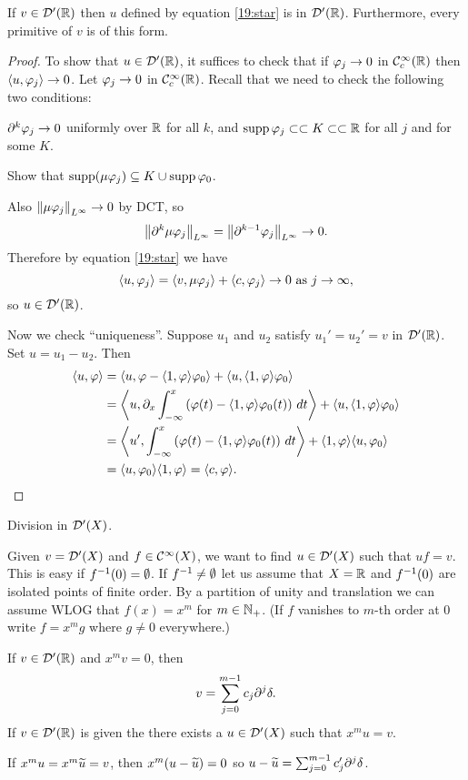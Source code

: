 \begin{thm}
  If $v\in\mathcal{D}'(\mathbb{R})$ then $u$ defined by equation \ref{19:star} is in $\mathcal{D}'(\mathbb{R})$.
  Furthermore, every primitive of $v$ is of this form.
\end{thm}

\begin{proof}
  To show that $u\in\mathcal{D}'(\mathbb{R})$, it suffices to check that if $\varphi_j\to0$ in $\mathcal{C}_c^\infty(\mathbb{R})$ then ${\left\langle u,\varphi_j \right\rangle}\to0$.
  Let $\varphi_j\to0$ in $\mathcal{C}_c^\infty(\mathbb{R})$.
  Recall that we need to check the following two conditions:
  \begin{itm}
    \io $\partial^k\varphi_j\to0$ uniformly over $\mathbb{R}$ for all $k$, and
    \io $\operatorname{supp}\varphi_j\subset\subset K\subset\subset \mathbb{R}$ for all $j$ and for some $K$.
  \end{itm}
  \begin{exer}
    Show that $\operatorname{supp}(\mu\varphi_j)\subseteq K\cup\operatorname{supp}\varphi_0$.
  \end{exer}
  Also $\left\lVert \mu\varphi_j \right\rVert_{L^\infty}\to0$ by DCT, so
  \[ \left\lVert \partial^k\mu\varphi_j \right\rVert_{L^\infty} = \left\lVert \partial^{k-1}\varphi_j \right\rVert_{L^\infty} \to 0. \]
  Therefore by equation \ref{19:star} we have
  \[ {\left\langle u,\varphi_j \right\rangle} = {\left\langle v,\mu\varphi_j \right\rangle} + {\left\langle c,\varphi_j \right\rangle} \to 0 \text{ as } j\to\infty, \]
  so $u\in\mathcal{D}'(\mathbb{R})$.

  Now we check ``uniqueness''.
  Suppose $u_1$ and $u_2$ satisfy $u_1'=u_2'=v$ in $\mathcal{D}'(\mathbb{R})$.
  Set $u=u_1-u_2$.
  Then
  \begin{align*}
    {\left\langle u,\varphi\right\rangle} &= {\left\langle u,\varphi-{\left\langle 1,\varphi \right\rangle}\varphi_0 \right\rangle} + {\left\langle u,{\left\langle 1,\varphi \right\rangle}\varphi_0 \right\rangle} \\
    &= {\left\langle u, \partial_x \int_{-\infty}^x \left( \varphi(t)-{\left\langle 1,\varphi \right\rangle}\varphi_0(t) \right) \, dt \right\rangle} + {\left\langle u,{\left\langle 1,\varphi \right\rangle}\varphi_0 \right\rangle} \\
    &= {\left\langle u', \int_{-\infty}^x \left( \varphi(t)-{\left\langle 1,\varphi \right\rangle}\varphi_0(t) \right) \, dt \right\rangle} + {\left\langle 1,\varphi \right\rangle}{\left\langle u,\varphi_0 \right\rangle} \\
    &= {\left\langle u,\varphi_0 \right\rangle}{\left\langle 1,\varphi \right\rangle} = {\left\langle c,\varphi \right\rangle}. \qedhere
  \end{align*}
\end{proof}

Division in $\mathcal{D}'(X)$.

Given $v=\mathcal{D}'(X)$ and $f\in\mathcal{C}^\infty(X)$, we want to find $u\in\mathcal{D}'(X)$ such that $uf=v$.
This is easy if $f^{-1}(0)=\emptyset$.
If $f^{-1}\neq\emptyset$ let us assume that $X=\mathbb{R}$ and $f^{-1}(0)$ are isolated points of finite order.
By a partition of unity and translation we can assume WLOG that $f(x)=x^m$ for $m\in\mathbb{N}_+$.
(If $f$ vanishes to $m$-th order at $0$ write $f=x^mg$ where $g\neq0$ everywhere.)

\begin{thm}
  \lv
  \begin{enum}
    \io If $v\in\mathcal{D}'(\mathbb{R})$ and $x^mv=0$, then
    \[ v = \sum_{j=0}^{m-1} c_j\partial^j\delta. \]
    \io If $v\in\mathcal{D}'(\mathbb{R})$ is given the there exists a $u\in\mathcal{D}'(X)$ such that $x^mu=v$.
  \end{enum}
\end{thm}

\begin{rmk}
  If $x^mu=x^m\widetilde u=v$, then $x^m(u-\widetilde u)=0$ so $u-\widetilde u=\sum_{j=0}^{m-1}c'_j\partial^j\delta$.
\end{rmk}
